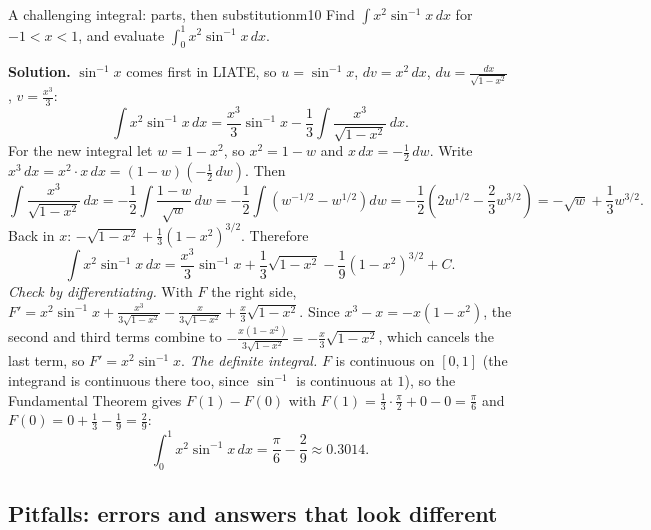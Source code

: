 \documentclass[11pt]{article}
\begin{document}
\begin{exmp}{A challenging integral: parts, then substitution}{m10}
Find $\int x^2\sin^{-1}x\,dx$ for $-1<x<1$, and evaluate $\int_0^1x^2\sin^{-1}x\,dx$.

\textbf{Solution.} $\sin^{-1}x$ comes first in LIATE, so $u=\sin^{-1}x$, $dv=x^2\,dx$, $du=\frac{dx}{\sqrt{1-x^2}}$, $v=\frac{x^3}3$:
\[\int x^2\sin^{-1}x\,dx=\frac{x^3}3\sin^{-1}x-\frac13\int\frac{x^3}{\sqrt{1-x^2}}\,dx .\]
For the new integral let $w=1-x^2$, so $x^2=1-w$ and $x\,dx=-\frac12\,dw$. Write $x^3\,dx=x^2\cdot x\,dx=(1-w)\left(-\frac12\,dw\right)$. Then
\[\int\frac{x^3}{\sqrt{1-x^2}}\,dx=-\frac12\int\frac{1-w}{\sqrt w}\,dw=-\frac12\int\left(w^{-1/2}-w^{1/2}\right)dw=-\frac12\left(2w^{1/2}-\frac23w^{3/2}\right)=-\sqrt w+\frac13w^{3/2}.\]
Back in $x$: $-\sqrt{1-x^2}+\frac13\left(1-x^2\right)^{3/2}$. Therefore
\[\int x^2\sin^{-1}x\,dx=\frac{x^3}3\sin^{-1}x+\frac13\sqrt{1-x^2}-\frac19\left(1-x^2\right)^{3/2}+C .\]
\emph{Check by differentiating.} With $F$ the right side, $F'=x^2\sin^{-1}x+\frac{x^3}{3\sqrt{1-x^2}}-\frac{x}{3\sqrt{1-x^2}}+\frac x3\sqrt{1-x^2}$. Since $x^3-x=-x\left(1-x^2\right)$, the second and third terms combine to $-\frac{x\left(1-x^2\right)}{3\sqrt{1-x^2}}=-\frac x3\sqrt{1-x^2}$, which cancels the last term, so $F'=x^2\sin^{-1}x$.
\emph{The definite integral.} $F$ is continuous on $[0,1]$ (the integrand is continuous there too, since $\sin^{-1}$ is continuous at $1$), so the Fundamental Theorem gives $F(1)-F(0)$ with $F(1)=\frac13\cdot\frac\pi2+0-0=\frac\pi6$ and $F(0)=0+\frac13-\frac19=\frac29$:
\[\int_0^1x^2\sin^{-1}x\,dx=\frac\pi6-\frac29\approx0.3014 .\]
\end{exmp}

\subsection*{Pitfalls: errors and answers that look different}
\end{document}
